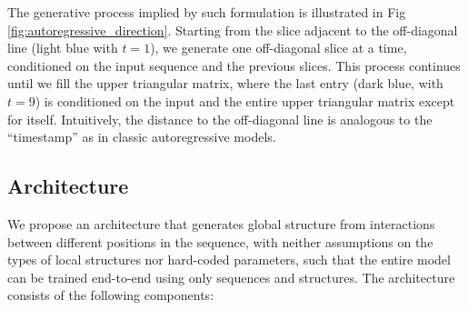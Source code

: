 \documentclass{article}
\begin{document}
The generative process implied by such formulation is illustrated in Fig \ref{fig:autoregressive_direction}.
Starting from the slice adjacent to the off-diagonal line (light blue with $t=1$),
we generate one off-diagonal slice at a time, conditioned on the input sequence and the previous slices.
This process continues until we fill the upper triangular matrix,
where the last entry (dark blue, with $t=9$) is conditioned on the input and the entire upper triangular matrix except for itself.
Intuitively, the distance to the off-diagonal line is analogous to the ``timestamp'' as in classic autoregressive models.

%
%







\subsection{Architecture}


We propose an architecture that generates global structure from interactions between different positions in the sequence,
with neither assumptions on the types of local structures nor hard-coded parameters,
such that the entire model can be trained end-to-end using only sequences and structures.
The architecture consists of the following components:
\end{document}
